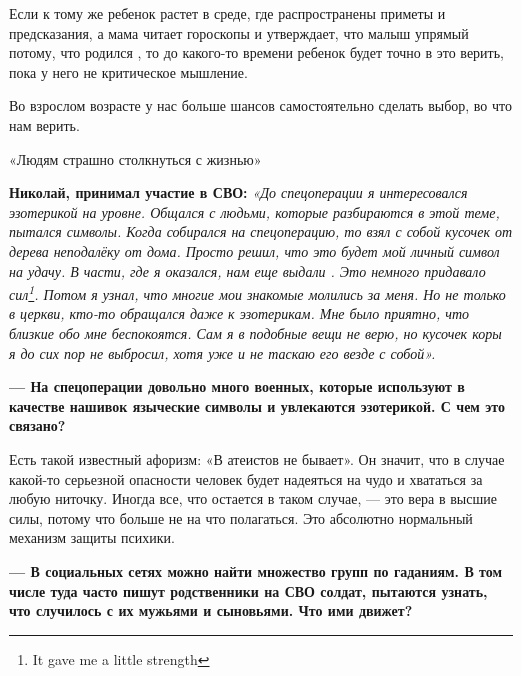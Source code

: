 Если к тому же ребенок растет в среде, где распространены приметы и предсказания, а мама читает гороскопы и
утверждает, что малыш упрямый потому, что родился , то до
какого-то времени ребенок будет точно в это верить, пока у него не
 критическое мышление.

Во взрослом возрасте у нас больше шансов самостоятельно сделать выбор, во что нам верить.

\vspace*{1em}
\begin{center}
    \Large «Людям страшно столкнуться с жизнью»
\end{center}
\vspace*{1em}

\textbf{Николай, принимал участие в СВО: } \textit{«До спецоперации я интересовался эзотерикой на  уровне. Общался с людьми, которые разбираются в этой теме, пытался  символы. Когда собирался на спецоперацию, то взял с собой кусочек  от дерева неподалёку от дома. Просто решил, что это будет мой личный символ на удачу.
В части, где я оказался, нам еще выдали . Это немного придавало сил\footnote{It gave me a little strength}. Потом я узнал, что многие мои знакомые молились за меня. Но не только в церкви, кто-то обращался даже к эзотерикам. Мне было приятно, что близкие обо мне беспокоятся. Сам я в подобные вещи не верю, но кусочек коры я до сих пор не выбросил, хотя уже и не таскаю его везде с собой».}

\textbf{--- На спецоперации довольно много военных, которые используют в качестве нашивок языческие символы и увлекаются эзотерикой. С чем это связано?}

Есть такой известный афоризм: «В  атеистов не бывает». Он значит, что в случае какой-то серьезной опасности человек будет надеяться на чудо и хвататься за любую ниточку. Иногда все, что остается в таком случае, — это вера в высшие силы, потому что больше не на что полагаться. Это абсолютно нормальный механизм защиты психики.

\textbf{--- В социальных сетях можно найти множество групп по гаданиям. В том числе туда часто пишут родственники  на СВО солдат, пытаются узнать, что случилось с их мужьями и сыновьями. Что ими движет? }


